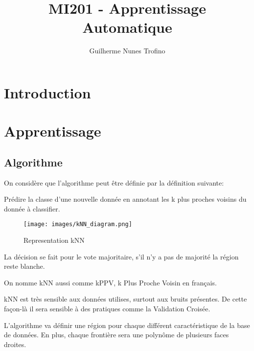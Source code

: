 \documentclass{article}
\title{MI201 - Apprentissage Automatique}
\author{Guilherme Nunes Trofino}
\begin{document}
\maketitle
\setlength{\parindent}{0pt}

\newpage\tableofcontents

\section{Introduction}

% 
% 

\section{Apprentissage}
\subsection{Algorithme}
On considère que l'algorithme peut être définie par la définition suivante:
\begin{definition}
    Prédire la classe d'une nouvelle donnée en annotant les k plus proches voisins du donnée à classifier.
    \begin{figure}[H]
        \centering
        \texttt{[image: images/kNN\_diagram.png]}
        \caption{Representation kNN}
    \end{figure}
    La décision se fait pour le vote majoritaire, s'il n'y a pas de majorité la région reste blanche. 
\end{definition}
\begin{remark}
    On nomme kNN aussi comme kPPV, k Plus Proche Voisin en français.
\end{remark}
\begin{remark}
    kNN est très sensible aux données utilises, surtout aux bruits présentes. De cette façon-là il sera sensible à des pratiques comme la Validation Croisée.
\end{remark}
L'algorithme va définir une région pour chaque différent caractéristique de la base de données. En plus, chaque frontière sera une polynôme de plusieurs faces droites.\\
\end{document}
